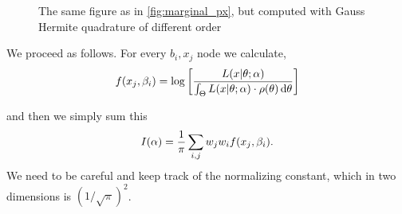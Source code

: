 \documentclass{article}
\begin{document}
\begin{figure}[h]
\begin{center}
\caption{The same figure as in \cref{fig:marginal_px}, but computed
with Gauss Hermite quadrature of different order}
\label{fig:marginal_px_gauss_hermite}
\end{center}
\end{figure}

We proceed as follows. For every $b_i, x_j$ node we calculate, 
$$f(x_j,{\beta}_i) =  \log\left[\frac{L(x|{\theta}; {\alpha})}
										{\int_\Theta L(x|{\theta};{\alpha})\cdot \rho({\theta}) \, \mathrm{d} {\theta}} \right]$$
										
and then we simply sum this $$I({\alpha}) = \frac 1 \pi \sum_{i,j} w_j w_i f(x_j,
{\beta}_i).$$ We need to be careful and keep track of the normalizing constant, which
in two dimensions is $(1/\sqrt{\pi})^2$.
\end{document}
